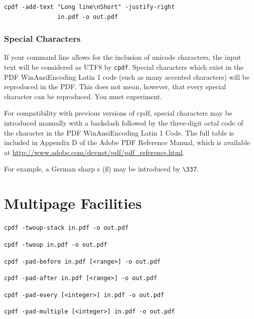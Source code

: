\documentclass[a4paper,makeidx]{memoir}
\begin{document}
\begin{framed}
  \small\begin{verbatim}cpdf -add-text "Long line\nShort" -justify-right
               in.pdf -o out.pdf\end{verbatim}
\end{framed}

\subsection{Special Characters}

If your command line allows for the inclusion of unicode characters, the input
text will be considered as UTF8 by \verb!cpdf!. Special characters which exist
in the PDF WinAnsiEncoding Latin 1 code (such as many accented characters) will
be reproduced in the PDF. This does not mean, however, that every special
character can be reproduced. You must experiment.

For compatibility with previous versions of cpdf, special characters may be
introduced manually with a backslash followed by the three-digit octal code of
the character in the PDF WinAnsiEncoding Latin 1 Code. The full table is
included in Appendix D of the Adobe PDF Reference Manual, which is available at
\url{http://www.adobe.com/devnet/pdf/pdf_reference.html}.

For example, a German sharp s (\ss) may be introduced by \verb!\337!. 

\chapter{Multipage Facilities}
  \begin{framed}
    \small\noindent\verb!cpdf -twoup-stack in.pdf -o out.pdf! 

    \vspace{1.5mm}
    \small\noindent\verb!cpdf -twoup in.pdf -o out.pdf! 

    \vspace{1.5mm}
    \small\noindent\verb!cpdf -pad-before in.pdf [<range>] -o out.pdf!

    \vspace{1.5mm}
    \small\noindent\verb!cpdf -pad-after in.pdf [<range>] -o out.pdf!

    \vspace{1.5mm}
    \small\noindent\verb!cpdf -pad-every [<integer>] in.pdf -o out.pdf!

    \vspace{1.5mm}
    \small\noindent\verb!cpdf -pad-multiple [<integer>] in.pdf -o out.pdf!
  \end{framed}
\end{document}
